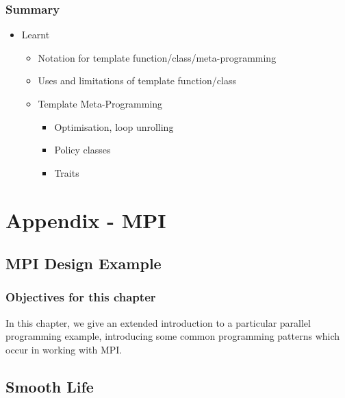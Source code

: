 \subsubsection{Summary}\label{summary-5}

\begin{itemize}
\itemsep1pt\parskip0pt
\item
  Learnt

  \begin{itemize}
  \itemsep1pt\parskip0pt
  \item
    Notation for template function/class/meta-programming
  \item
    Uses and limitations of template function/class
  \item
    Template Meta-Programming

    \begin{itemize}
    \itemsep1pt\parskip0pt
    \item
      Optimisation, loop unrolling
    \item
      Policy classes
    \item
      Traits
    \end{itemize}
  \end{itemize}
\end{itemize}

\section{Appendix - MPI}\label{appendix---mpi}

\subsection{MPI Design Example}\label{mpi-design-example}

\subsubsection{Objectives for this
chapter}\label{objectives-for-this-chapter}

In this chapter, we give an extended introduction to a particular
parallel programming example, introducing some common programming
patterns which occur in working with MPI.

\subsection{Smooth Life}\label{smooth-life}

